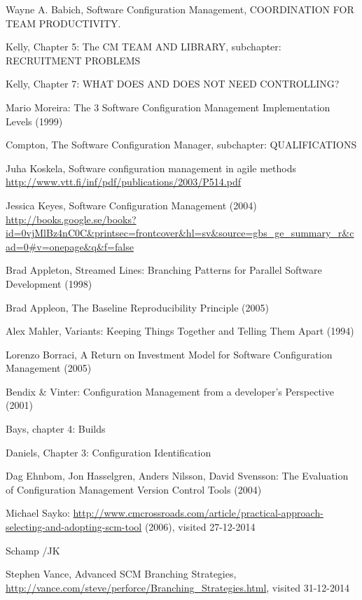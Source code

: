 \documentclass[10pt]{article}
\begin{document}
\begin{thebibliography}{1}

 Wayne A. Babich, Software Configuration Management, COORDINATION FOR TEAM PRODUCTIVITY.

 Kelly, Chapter 5: The CM TEAM AND LIBRARY, subchapter: RECRUITMENT PROBLEMS 

 Kelly, Chapter 7: WHAT DOES AND DOES NOT NEED CONTROLLING? 

 Mario Moreira: The 3 Software Configuration Management Implementation Levels (1999)

Compton, The Software Configuration Manager, subchapter: QUALIFICATIONS

Juha Koskela, Software configuration management in agile methods
\url{http://www.vtt.fi/inf/pdf/publications/2003/P514.pdf}

 Jessica Keyes, Software Configuration Management (2004) \url{http://books.google.se/books?id=0vjMlBz4nC0C&printsec=frontcover&hl=sv&source=gbs_ge_summary_r&cad=0#v=onepage&q&f=false}

 Brad Appleton, Streamed Lines: Branching Patterns for Parallel Software Development (1998)

 Brad Appleon, The Baseline Reproducibility Principle (2005)

 Alex Mahler, Variants: Keeping Things Together and Telling Them Apart (1994)

 Lorenzo Borraci, A Return on Investment Model for Software Configuration Management (2005)

 Bendix \& Vinter: Configuration Management from a developer's Perspective (2001)

 Bays, chapter 4: Builds

 Daniels, Chapter 3: Configuration Identification

 Dag Ehnbom, Jon Hasselgren, Anders Nilsson, David Svensson: The Evaluation of Configuration Management Version Control Tools (2004)

 Michael Sayko: \url{http://www.cmcrossroads.com/article/practical-approach-selecting-and-adopting-scm-tool} (2006), visited 27-12-2014

 Schamp /JK

 Stephen Vance, Advanced SCM Branching Strategies, \url{http://vance.com/steve/perforce/Branching_Strategies.html}, visited 31-12-2014


\end{thebibliography}
\end{document}
